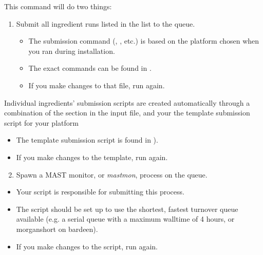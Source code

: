 \documentclass[letterpaper,10pt,english]{sphinxmanual}
\begin{document}
This command will do two things:
\begin{enumerate}
\item {} 
Submit all ingredient runs listed in the  list to the queue.
\begin{itemize}
\item {} 
The submission command (, , etc.) is based on the platform chosen when you ran  during installation.

\item {} 
The exact commands can be found in .

\item {} 
If you make changes to that  file, run  again.

\end{itemize}

\end{enumerate}

Individual ingredients' submission scripts are created automatically through a combination of the  section in the input file, and your the template submission script for your platform
\begin{itemize}
\item {} 
The template submission script is found in ).

\item {} 
If you make changes to the template, run  again.

\end{itemize}
\begin{enumerate}
\setcounter{enumi}{1}
\item {} 
Spawn a MAST monitor, or \emph{mastmon}, process on the queue.

\end{enumerate}
\begin{itemize}
\item {} 
Your  script is responsible for submitting this process.

\item {} 
The script should be set up to use the shortest, fastest turnover queue available (e.g. a serial queue with a maximum walltime of 4 hours, or morganshort on bardeen).

\item {} 
If you make changes to the script, run  again.

\end{itemize}
\end{document}
